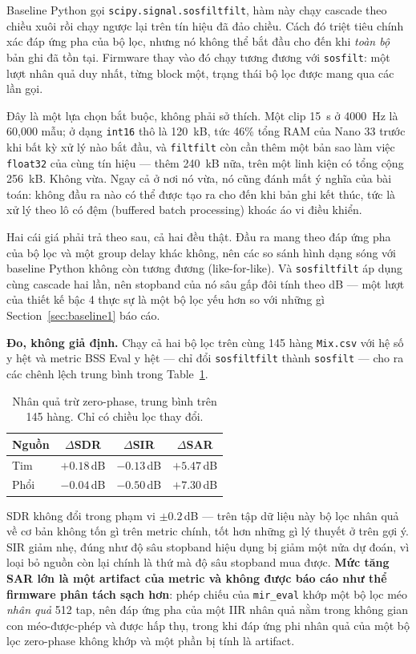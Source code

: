 \documentclass[11pt]{article}
\begin{document}
Baseline Python gọi \texttt{scipy.signal.sosfiltfilt}, hàm này chạy cascade
theo chiều xuôi rồi chạy ngược lại trên tín hiệu đã đảo chiều. Cách đó
triệt tiêu chính xác đáp ứng pha của bộ lọc, nhưng nó không thể bắt đầu
cho đến khi \emph{toàn bộ} bản ghi đã tồn tại. Firmware thay vào đó chạy
tương đương với \texttt{sosfilt}: một lượt nhân quả duy nhất, từng block
một, trạng thái bộ lọc được mang qua các lần gọi.

Đây là một lựa chọn bắt buộc, không phải sở thích. Một clip 15~s ở
4000~Hz là 60{,}000 mẫu; ở dạng \texttt{int16} thô là 120~kB, tức 46\%
tổng RAM của Nano 33 trước khi bất kỳ xử lý nào bắt đầu, và
\texttt{filtfilt} còn cần thêm một bản sao làm việc \texttt{float32} của
cùng tín hiệu --- thêm 240~kB nữa, trên một linh kiện có tổng cộng 256~kB.
Không vừa. Ngay cả ở nơi nó vừa, nó cũng đánh mất ý nghĩa của bài toán:
không đầu ra nào có thể được tạo ra cho đến khi bản ghi kết thúc, tức là
xử lý theo lô có đệm (buffered batch processing) khoác áo vi điều khiển.

Hai cái giá phải trả theo sau, cả hai đều thật. Đầu ra mang theo đáp ứng
pha của bộ lọc và một group delay khác không, nên các so sánh hình dạng
sóng với baseline Python không còn tương đương (like-for-like). Và
\texttt{sosfiltfilt} áp dụng cùng cascade hai lần, nên stopband của nó sâu
gấp đôi tính theo dB --- một lượt của thiết kế bậc 4 thực sự là một bộ
lọc yếu hơn so với những gì Section~\ref{sec:baseline1} báo cáo.

\textbf{Đo, không giả định.} Chạy cả hai bộ lọc trên cùng 145 hàng
\texttt{Mix.csv} với hệ số y hệt và metric BSS Eval y hệt --- chỉ đổi
\texttt{sosfiltfilt} thành \texttt{sosfilt} --- cho ra các chênh lệch
trung bình trong Table~\ref{tab:causal}.

\begin{table}[H]
\centering
\caption{Nhân quả trừ zero-phase, trung bình trên 145 hàng. Chỉ có chiều lọc thay đổi.}
\label{tab:causal}
\begin{tabular}{@{}lccc@{}}
\toprule
Nguồn & $\Delta$SDR & $\Delta$SIR & $\Delta$SAR \\
\midrule
Tim  & $+0.18$\,dB & $-0.13$\,dB & $+5.47$\,dB \\
Phổi & $-0.04$\,dB & $-0.50$\,dB & $+7.30$\,dB \\
\bottomrule
\end{tabular}
\end{table}

SDR không đổi trong phạm vi $\pm0.2$\,dB --- trên tập dữ liệu này bộ lọc
nhân quả về cơ bản không tốn gì trên metric chính, tốt hơn những gì lý
thuyết ở trên gợi ý. SIR giảm nhẹ, đúng như độ sâu stopband hiệu dụng bị
giảm một nửa dự đoán, vì loại bỏ nguồn còn lại chính là thứ mà độ sâu
stopband mua được. \textbf{Mức tăng SAR lớn là một artifact của metric và
không được báo cáo như thể firmware phân tách sạch hơn}: phép chiếu của
\texttt{mir\_eval} khớp một bộ lọc méo \emph{nhân quả} 512 tap, nên đáp
ứng pha của một IIR nhân quả nằm trong không gian con méo-được-phép và
được hấp thụ, trong khi đáp ứng phi nhân quả của một bộ lọc zero-phase
không khớp và một phần bị tính là artifact.
\end{document}
